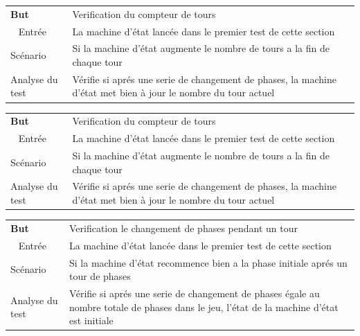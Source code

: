 \begin{center}
    \centering
    \begin{tabular}[h]{|m{4cm}|m{12cm}|} 
        \hline
        \rowcolor[HTML]{F8B400}
        \textbf{But} & Verification du compteur de tours \\\
        \hline
        \hline
        \rowcolor[HTML]{F7F7F7}
        Entrée & La machine d'état lancée dans le premier test de cette section  \\
        \hline
        \rowcolor[HTML]{F7F7F7}
        Scénario & Si la machine d'état augmente le nombre de tours a la fin de chaque tour\\
        \hline
        \rowcolor[HTML]{F7F7F7}
        Analyse du test & Vérifie si aprés une serie de changement de phases, la machine d'état met bien à jour le nombre du tour actuel \\
        \hline
    \end{tabular}
\end{center}

\begin{center}
    \centering
    \begin{tabular}[h]{|m{4cm}|m{12cm}|} 
        \hline
        \rowcolor[HTML]{F8B400}
        \textbf{But} & Verification du compteur de tours \\\
        \hline
        \hline
        \rowcolor[HTML]{F7F7F7}
        Entrée & La machine d'état lancée dans le premier test de cette section  \\
        \hline
        \rowcolor[HTML]{F7F7F7}
        Scénario & Si la machine d'état augmente le nombre de tours a la fin de chaque tour\\
        \hline
        \rowcolor[HTML]{F7F7F7}
        Analyse du test & Vérifie si aprés une serie de changement de phases, la machine d'état met bien à jour le nombre du tour actuel \\
        \hline
    \end{tabular}
\end{center}

\begin{center}
    \centering
    \begin{tabular}[h]{|m{4cm}|m{12cm}|} 
        \hline
        \rowcolor[HTML]{F8B400}
        \textbf{But} & Verification le changement de phases pendant un tour \\\
        \hline
        \hline
        \rowcolor[HTML]{F7F7F7}
        Entrée & La machine d'état lancée dans le premier test de cette section  \\
        \hline
        \rowcolor[HTML]{F7F7F7}
        Scénario & Si la machine d'état recommence bien a la phase initiale aprés un tour de phases\\
        \hline
        \rowcolor[HTML]{F7F7F7}
        Analyse du test & Vérifie si aprés une serie de changement de phases égale au nombre totale de phases dans le jeu, l'état de la machine d'état est initiale\\
        \hline
    \end{tabular}
\end{center}


